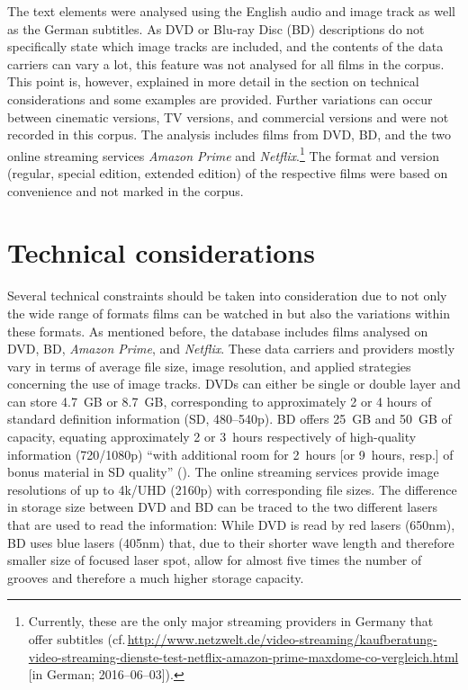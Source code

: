 The text elements were analysed using the English audio and image track as well as the German subtitles. As DVD or Blu-ray Disc (BD) descriptions do not specifically state which image tracks are included, and the contents of the data carriers can vary a lot, this feature was not analysed for all films in the corpus. This point is, however, explained in more detail in the section on technical considerations and some examples are provided. Further variations can occur between cinematic versions, TV versions, and commercial versions and were not recorded in this corpus. The analysis includes films from DVD, BD, and the two online streaming services \textit{Amazon Prime} and \textit{Netflix}.\footnote{Currently, these are the only major streaming providers in Germany that offer subtitles (cf.\,\url{http://www.netzwelt.de/video-streaming/kaufberatung-video-streaming-dienste-test-netflix-amazon-prime-maxdome-co-vergleich.html} [in German; 2016--06--03]).} The format and version (regular, special edition, extended edition) of the respective films were based on convenience and not marked in the corpus.

\section{Technical considerations}\label{sec:2.2}

Several technical constraints should be taken into consideration due to not only the wide range of formats films can be watched in but also the variations within these formats. As mentioned before, the database includes films analysed on DVD, BD, \textit{Amazon Prime}, and \textit{Netflix}. These data carriers and providers mostly vary in terms of average file size, image resolution, and applied strategies concerning the use of image tracks. DVDs can either be single or double layer and can store 4.7~GB or 8.7~GB, corresponding to approximately 2 or 4 hours of standard definition information (SD, 480--540p). BD offers 25~GB and 50~GB of capacity, equating approximately 2 or 3~hours respectively of high-quality information (720/1080p) “with additional room for 2~hours [or 9~hours, resp.] of bonus material in SD quality” (\citealt{Blu-ray_disc_association2015}). The online streaming services provide image resolutions of up to 4k/UHD (2160p) with corresponding file sizes. The difference in storage size between DVD and BD can be traced to the two different lasers that are used to read the information: While DVD is read by red lasers (650nm), BD uses blue lasers (405nm) that, due to their shorter wave length and therefore smaller size of focused laser spot, allow for almost five times the number of grooves and therefore a much higher storage capacity.


